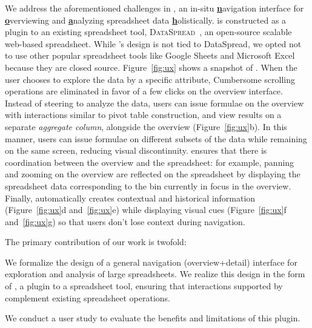  We address the aforementioned challenges
in \noah,
an in-situ
\textbf{\underline{n}}avigation interface
for \textbf{\underline{o}}verviewing
and \textbf{\underline{a}}nalyzing
spreadsheet data \textbf{\underline{h}}olistically.
\noah is constructed as a plugin to
an existing spreadsheet tool,
{\scshape DataSpread}~\cite{dataspread},
an open-source scalable web-based spreadsheet.
While \noah's design is not tied to {\sc DataSpread},
we opted not to use other popular spreadsheet
tools like Google Sheets and Microsoft Excel because they
are closed source.
Figure~\ref{fig:ux} shows a snapshot of \noah.
When the user chooses to explore
the data by a specific attribute,
Cumbersome scrolling operations are eliminated in favor
of a few clicks on the overview interface. Instead of steering to analyze the data,
users can issue formulae
on the overview with interactions similar to pivot table construction,
and view results on a separate {\em aggregate column},
alongside the overview (Figure~\ref{fig:ux}b). 
In this manner,
users can issue formulae on different
subsets of the data while remaining on the same screen,
reducing visual discontinuity.
\noah ensures that there is coordination between
the overview and the spreadsheet:
for example, panning and zooming on the overview
are reflected on the spreadsheet by displaying
the spreadsheet data corresponding to the bin
currently in focus in the overview.
Finally, \noah automatically creates
contextual and historical information
(Figure~\ref{fig:ux}d and~\ref{fig:ux}e)
while displaying visual cues
(Figure~\ref{fig:ux}f and~\ref{fig:ux}g)
so that users don't lose context during navigation.

The primary contribution of our work is twofold:
\squishlist
\item We formalize the design of a general
navigation (overview+detail) interface
for exploration and analysis of large spreadsheets.
We realize this design in the form of \noah,
a plugin to a spreadsheet tool,
ensuring that interactions supported by \noah
complement existing spreadsheet operations.
\item We conduct a user study to evaluate
the benefits and limitations of this plugin.
\squishend


